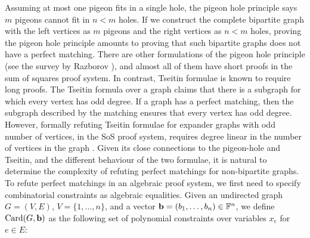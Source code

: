 \documentclass[11pt]{article}
\begin{document}
Assuming at most one pigeon fits in a single hole, the pigeon hole principle says $m$ pigeons cannot fit in $n < m$ holes.
If we construct the complete bipartite graph with the left vertices as $m$ pigeons and the right vertices as $n < m$ holes, proving the pigeon hole principle amounts to proving that such bipartite graphs does not have a perfect matching.
There are other formulations of the pigeon hole principle (see the survey by Razborov \citep{razbarov2002pgp}), and almost all of them have short proofs in the sum of squares proof system.
In contrast, Tseitin formulae is known to require long proofs. The Tseitin formula over a graph claims that there is a subgraph for which every vertex has odd degree.
If a graph has a perfect matching, then the subgraph described by the matching ensures that every vertex has odd degree.
However, formally refuting Tseitin formulae for expander graphs with odd number of vertices, in the SoS proof system, requires degree linear in the number of vertices in the graph \cite{grigoriev2001linear}.
Given its close connections to the pigeon-hole and Tseitin, and the different behaviour of the two formulae, it is natural to determine the complexity of refuting perfect matchings for non-bipartite graphs.
To refute perfect matchings in an algebraic proof system, we first need to specify combinatorial constraints as algebraic equalities. Given an undirected graph $G=(V,E)$, $V = \{1, \ldots, n\}$, and a vector $\mathbf{b} = (b_1, \ldots, b_{n}) \in \mathbb{F}^{n}$,
we define $\text{Card}(G, \mathbf{b})$ as the following set of polynomial constraints over variables $x_e$ for $e \in E$:
\end{document}
